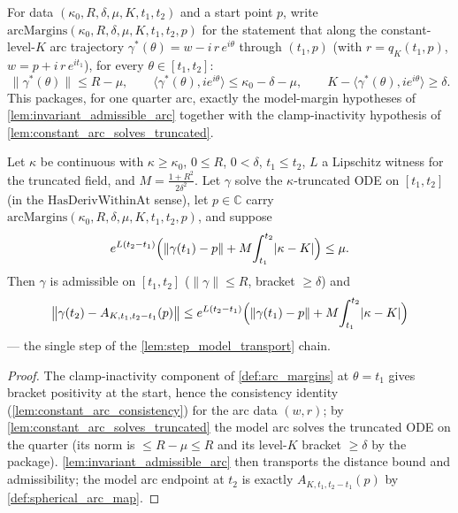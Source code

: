\begin{definition}
  \label{def:arc_margins}
  For data $(\kappa_0,R,\delta,\mu,K,t_1,t_2)$ and a start point $p$, write
  $\mathrm{arcMargins}(\kappa_0,R,\delta,\mu,K,t_1,t_2,p)$ for the statement that
  along the constant-level-$K$ arc trajectory
  $\gamma^\ast(\theta)=w-i\,r\,e^{i\theta}$ through $(t_1,p)$ (with $r=q_K(t_1,p)$,
  $w=p+i\,r\,e^{it_1}$), for every $\theta\in[t_1,t_2]$:
  \[
    \|\gamma^\ast(\theta)\|\le R-\mu,\qquad
    \langle \gamma^\ast(\theta),ie^{i\theta}\rangle\le\kappa_0-\delta-\mu,\qquad
    K-\langle \gamma^\ast(\theta),ie^{i\theta}\rangle\ge\delta .
  \]
  This packages, for one quarter arc, exactly the model-margin hypotheses of
  \cref{lem:invariant_admissible_arc} together with the clamp-inactivity hypothesis
  of \cref{lem:constant_arc_solves_truncated}.
\end{definition}

\begin{lemma}
  \label{lem:quarter_step_transport}
  Let $\kappa$ be continuous with $\kappa\ge\kappa_0$, $0\le R$, $0<\delta$,
  $t_1\le t_2$, $L$ a Lipschitz witness for the truncated field, and
  $M=\tfrac{1+R^2}{2\delta^2}$. Let $\gamma$ solve the $\kappa$-truncated ODE on
  $[t_1,t_2]$ (in the $\mathrm{HasDerivWithinAt}$ sense), let $p\in\mathbb C$ carry
  $\mathrm{arcMargins}(\kappa_0,R,\delta,\mu,K,t_1,t_2,p)$, and suppose
  \[
    e^{L(t_2-t_1)}\Bigl(\|\gamma(t_1)-p\|+M\!\int_{t_1}^{t_2}\!|\kappa-K|\Bigr)\le\mu .
  \]
  Then $\gamma$ is admissible on $[t_1,t_2]$ ($\|\gamma\|\le R$, bracket $\ge\delta$) and
  \[
    \bigl\|\gamma(t_2)-A_{K,t_1,t_2-t_1}(p)\bigr\|
    \le e^{L(t_2-t_1)}\Bigl(\|\gamma(t_1)-p\|+M\!\int_{t_1}^{t_2}\!|\kappa-K|\Bigr)
  \]
  — the single step of the \cref{lem:step_model_transport} chain.
\end{lemma}

\begin{proof}
        \leanok
  The clamp-inactivity component of \cref{def:arc_margins} at $\theta=t_1$ gives
  bracket positivity at the start, hence the consistency identity
  (\cref{lem:constant_arc_consistency}) for the arc data $(w,r)$; by
  \cref{lem:constant_arc_solves_truncated} the model arc solves the truncated ODE on
  the quarter (its norm is $\le R-\mu\le R$ and its level-$K$ bracket $\ge\delta$ by
  the package). \cref{lem:invariant_admissible_arc} then transports the distance
  bound and admissibility; the model arc endpoint at $t_2$ is exactly
  $A_{K,t_1,t_2-t_1}(p)$ by \cref{def:spherical_arc_map}.
\end{proof}

